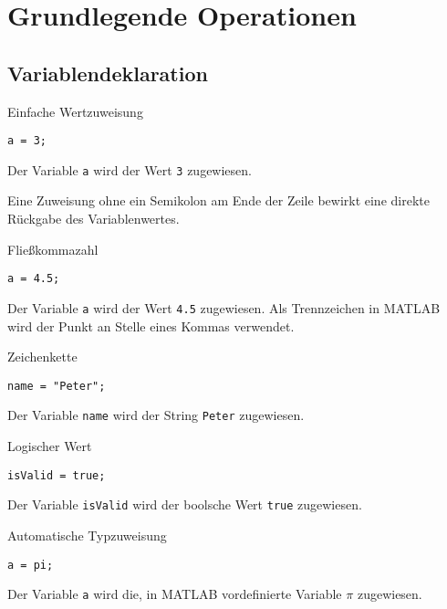 \section{Grundlegende Operationen}
        \subsection{Variablendeklaration}
                \begin{CodeErklaerungBox}{Einfache Wertzuweisung}
                \begin{lstlisting}
a = 3;
                \end{lstlisting}
                \tcblower
                Der Variable \texttt{a} wird der Wert \texttt{3} zugewiesen.
                \end{CodeErklaerungBox}
                \noindent Eine Zuweisung ohne ein Semikolon am Ende der Zeile bewirkt eine direkte Rückgabe des Variablenwertes.
                \begin{CodeErklaerungBox}{Fließkommazahl}
                \begin{lstlisting}
a = 4.5;
                \end{lstlisting}
                \tcblower
                Der Variable \texttt{a} wird der Wert \texttt{4.5} zugewiesen. Als Trennzeichen in MATLAB wird der Punkt an Stelle eines Kommas verwendet.
                \end{CodeErklaerungBox}
                \begin{CodeErklaerungBox}{Zeichenkette}
                \begin{lstlisting}
name = "Peter";
                \end{lstlisting}
                \tcblower
                Der Variable \texttt{name} wird der String \texttt{Peter} zugewiesen.
                \end{CodeErklaerungBox}
                \begin{CodeErklaerungBox}{Logischer Wert}
                \begin{lstlisting}
isValid = true;
                \end{lstlisting}
                \tcblower
                Der Variable \texttt{isValid} wird der boolsche Wert \texttt{true} zugewiesen.
                \end{CodeErklaerungBox}
                \begin{CodeErklaerungBox}{Automatische Typzuweisung}
                \begin{lstlisting}
a = pi;
                \end{lstlisting}
                \tcblower
                Der Variable \texttt{a} wird die, in MATLAB vordefinierte Variable $\pi$ zugewiesen.
                \end{CodeErklaerungBox}
